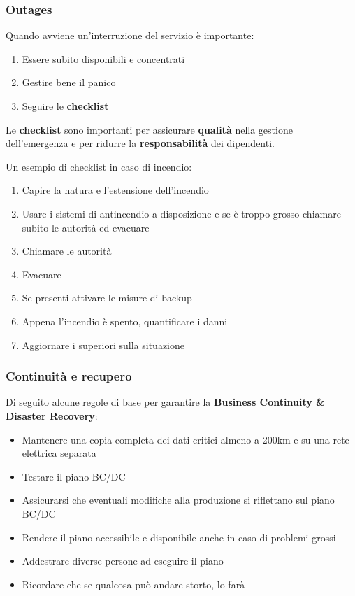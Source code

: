 \subsubsection{Outages}
Quando avviene un'interruzione del servizio è importante:
\begin{enumerate}
	\item Essere subito disponibili e concentrati
	\item Gestire bene il panico
	\item Seguire le \textbf{checklist}
\end{enumerate}
Le \textbf{checklist} sono importanti per assicurare \textbf{qualità} nella gestione dell'emergenza e per ridurre la \textbf{responsabilità} dei dipendenti.
\begin{example}[Checklist]
	Un esempio di checklist in caso di incendio:
	\begin{enumerate}
		\item Capire la natura e l'estensione dell'incendio
		\item Usare i sistemi di antincendio a disposizione e se è troppo grosso chiamare subito le autorità ed evacuare
		\item Chiamare le autorità
		\item Evacuare
		\item Se presenti attivare le misure di backup
		\item Appena l'incendio è spento, quantificare i danni
		\item Aggiornare i superiori sulla situazione
	\end{enumerate}
\end{example}

\subsubsection{Continuità e recupero}
Di seguito alcune regole di base per garantire la \textbf{Business Continuity \& Disaster Recovery}:
\begin{itemize}
	\item Mantenere una copia completa dei dati critici almeno a 200km e su una rete elettrica separata
	\item Testare il piano BC/DC
	\item Assicurarsi che eventuali modifiche alla produzione si riflettano sul piano BC/DC
	\item Rendere il piano accessibile e disponibile anche in caso di problemi grossi
	\item Addestrare diverse persone ad eseguire il piano
	\item Ricordare che se qualcosa può andare storto, lo farà
\end{itemize}
